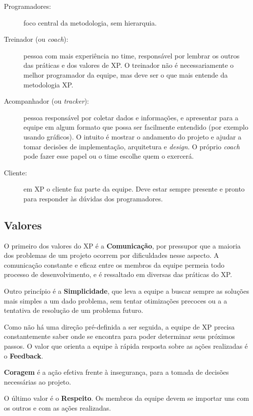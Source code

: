     \begin{description}
      \item[Programadores:]
	      foco central da metodologia, sem hierarquia.
      \item[Treinador (ou \textit{coach}):]
	      pessoa com mais experiência no time, responsável por lembrar os outros das práticas e dos valores de XP. O treinador não é necessariamente o melhor programador da equipe, mas deve ser o que mais entende da metodologia XP.
      \item[Acompanhador (ou \textit{tracker}):]
	      pessoa responsável por coletar dados e informações, e apresentar para a equipe em algum formato que possa ser facilmente entendido (por exemplo usando gráficos). O intuito é mostrar o andamento do projeto e ajudar a tomar decisões de implementação, arquitetura e \textit{design}. O próprio \textit{coach} pode fazer esse papel ou o time escolhe quem o exercerá.
      \item[Cliente:]
	      em XP o cliente faz parte da equipe. Deve estar sempre presente e pronto para responder às dúvidas dos programadores.
    \end{description}

  \subsection{Valores}
    O primeiro dos valores do XP é a \textbf{Comunicação}, por pressupor que a maioria dos problemas de um projeto ocorrem por dificuldades nesse aspecto. A comunicação constante e eficaz entre os membros da equipe permeia todo processo de desenvolvimento, e é ressaltado em diversas das práticas do XP.

    Outro princípio é a \textbf{Simplicidade}, que leva a equipe a buscar sempre as soluções mais simples a um dado problema, sem tentar otimizações precoces ou a a tentativa de resolução de um problema futuro.

    Como não há uma direção pré-definida a ser seguida, a equipe de XP precisa constantemente saber onde se encontra para poder determinar seus próximos passos. O valor que orienta a equipe à rápida resposta sobre as ações realizadas é o \textbf{Feedback}.

    \textbf{Coragem} é a ação efetiva frente à insegurança, para a tomada de decisões necessárias ao projeto.

    O último valor é o \textbf{Respeito}. Os membros da equipe devem se importar uns com os outros e com as ações realizadas.

